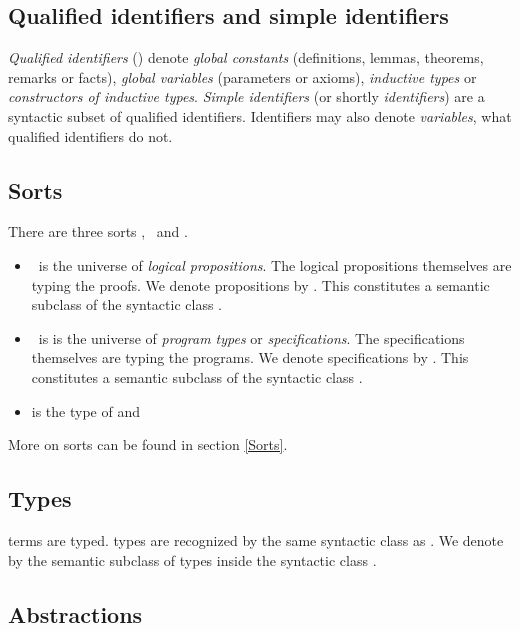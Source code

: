 \subsection{Qualified identifiers and simple identifiers}
\label{qualid}\label{ident}

{\em Qualified identifiers} ({\qualid}) denote {\em global constants}
(definitions, lemmas, theorems, remarks or facts), {\em global
variables} (parameters or axioms), {\em inductive
types} or {\em constructors of inductive types}.
{\em Simple identifiers} (or shortly {\em identifiers}) are a
syntactic subset of qualified identifiers.  Identifiers may also
denote {\em variables}, what qualified identifiers do not.

\subsection{Sorts}
\label{Gallina-sorts}

There are three sorts \Set, \Prop\ and \Type.

\begin{itemize}
\item \Prop\ is the universe of {\em logical propositions}.
The logical propositions themselves are typing the proofs.
We denote propositions by {\form}. This constitutes a semantic
subclass of the syntactic class {\term}.
\item \Set\ is is the universe of {\em program
types} or {\em specifications}.
The specifications themselves are typing the programs.
We denote specifications by {\specif}. This constitutes a semantic
subclass of the syntactic class {\term}.
\item {\Type} is the type of {\Set} and {\Prop}
\end{itemize}

\noindent More on sorts can be found in section \ref{Sorts}.

\subsection{Types}

{\Coq} terms are typed. {\Coq} types are recognized by the same
syntactic class as {\term}. We denote by {\type} the semantic subclass
of types inside the syntactic class {\term}.

\subsection{Abstractions}

